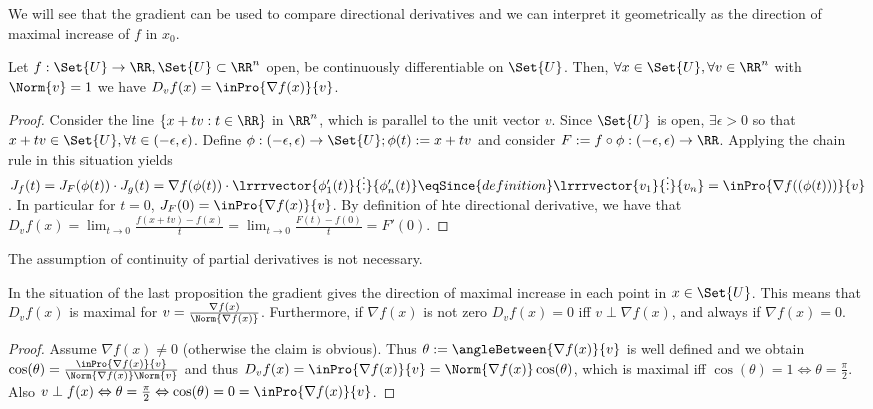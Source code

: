 \begin{rem}
  We will see that the gradient can be used to compare directional derivatives and we can interpret it geometrically as the direction of maximal increase of $f$ in $x_0$. 
\end{rem}
\begin{prop}
  Let $f:\Set{U}\to\RR, \Set{U}\subset\RR^n$ open, be continuously differentiable on $\Set{U}$. Then, $\forall x\in\Set{U}, \forall v\in\RR^n$ with $\Norm{v}=1$ we have $D_v f(x)=\inPro{\nabla f(x)}{v}$. 
\end{prop}
\begin{proof}
  Consider the line $\{x+tv:t\in\RR\}$ in $\RR^n$, which is parallel to the unit vector $v$. Since $\Set{U}$ is open, $\exists \epsilon>0$ so that $x+tv\in\Set{U}, \forall t\in(-\epsilon,\epsilon)$. Define $\phi:(-\epsilon,\epsilon)\to\Set{U}; \phi(t):=x+tv$ and consider $F:=f\circ \phi:(-\epsilon, \epsilon)\to\RR$. Applying the chain rule in this situation yields $J_f(t)=J_F(\phi(t))\cdot J_g(t)=\nabla f(\phi(t))\cdot \lrrrvector{\phi_1'(t)}{\vdots}{\phi_n'(t)}\eqSince{definition}\lrrrvector{v_1}{\vdots}{v_n}=\inPro{\nabla f((\phi(t)))}{v}$. In particular for $t=0$, $J_F(0)=\inPro{\nabla f(x)}{v}$. By definition of hte directional derivative, we have that $D_v f(x)=\lim_{t\to 0}\frac{f(x+tv)-f(x)}{t}=\lim_{t\to 0}\frac{F(t)-f(0)}{t}=F'(0)$.
\end{proof}
\begin{rem}
  The assumption of continuity of partial derivatives is not necessary. 
\end{rem}
\begin{cor}
  In the situation of the last proposition the gradient gives the direction of maximal increase in each point in $x\in\Set{U}$. This means that $D_v f(x)$ is maximal for $v=\frac{\nabla f(x)}{\Norm{\nabla f(x)}}$. Furthermore, if $\nabla f(x)$ is not zero $D_vf(x)=0$ iff $v\perp \nabla f(x)$, and always if $\nabla f(x)=0$. 
\end{cor}
\begin{proof}
  Assume $\nabla f(x)\neq 0$ (otherwise the claim is obvious). Thus $\theta:=\angleBetween{\nabla f(x)}{v}$ is well defined and we obtain $\cos(\theta)=\frac{\inPro{\nabla f(x)}{v}}{\Norm{\nabla f(x)}\Norm{v}}$ and thus $D_v f(x)=\inPro{\nabla f(x)}{v}=\Norm{\nabla f(x)}\cos(\theta)$, which is maximal iff $\cos(\theta)=1\Leftrightarrow \theta=\frac{\pi}{2}$. Also $v\perp f(x)\Leftrightarrow \theta=\frac{\pi}{2}\Leftrightarrow\cos(\theta)=0=\inPro{\nabla f(x)}{v}$. 
\end{proof}
